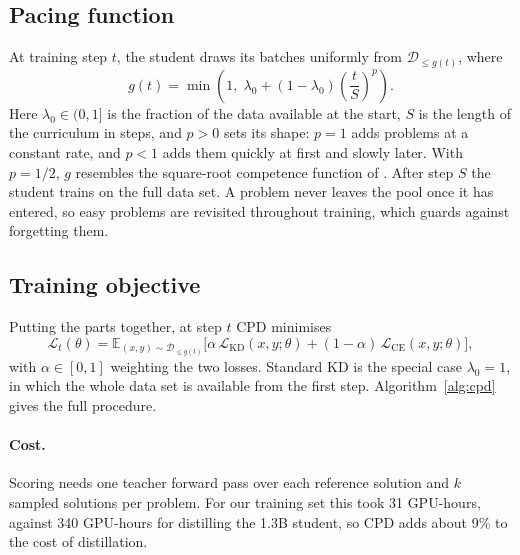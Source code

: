 \documentclass{article} %
\begin{document}
\subsection{Pacing function}
\label{sec:pacing}

At training step $t$, the student draws its batches uniformly from $\mathcal{D}_{\le g(t)}$, where
\begin{equation}
g(t) = \min\left( 1,\; \lambda_0 + (1 - \lambda_0) \left( \frac{t}{S} \right)^{p} \right).
\label{eq:pacing}
\end{equation}
Here $\lambda_0 \in (0, 1]$ is the fraction of the data available at the start, $S$ is the length of the curriculum in steps, and $p > 0$ sets its shape: $p = 1$ adds problems at a constant rate, and $p < 1$ adds them quickly at first and slowly later.
With $p = 1/2$, $g$ resembles the square-root competence function of \citet{platanios2019competence}.
After step $S$ the student trains on the full data set.
A problem never leaves the pool once it has entered, so easy problems are revisited throughout training, which guards against forgetting them.

\subsection{Training objective}
\label{sec:objective}

Putting the parts together, at step $t$ CPD minimises
\begin{equation}
\mathcal{L}_t(\theta) = \mathbb{E}_{(x, y) \sim \mathcal{D}_{\le g(t)}} \bigl[ \alpha\, \mathcal{L}_{\mathrm{KD}}(x, y; \theta) + (1 - \alpha)\, \mathcal{L}_{\mathrm{CE}}(x, y; \theta) \bigr],
\label{eq:objective}
\end{equation}
with $\alpha \in [0, 1]$ weighting the two losses.
Standard KD is the special case $\lambda_0 = 1$, in which the whole data set is available from the first step.
Algorithm~\ref{alg:cpd} gives the full procedure.

\paragraph{Cost.}
Scoring needs one teacher forward pass over each reference solution and $k$ sampled solutions per problem.
For our training set this took 31 GPU-hours, against 340 GPU-hours for distilling the 1.3B student, so CPD adds about 9\% to the cost of distillation.
\end{document}
